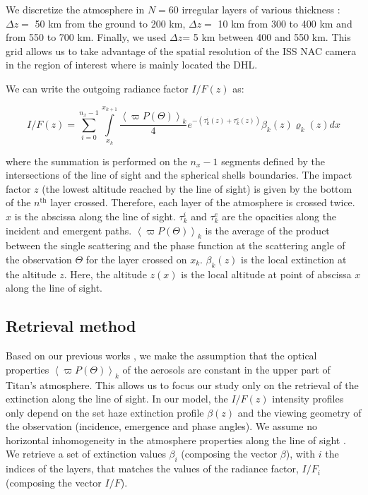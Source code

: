 We discretize the atmosphere in $N=60$ irregular layers of various thickness : $\Delta z =$ 50 km from the
ground to 200 km, $\Delta z =$ 10 km from 300 to 400 km and from 550 to 700 km. Finally, we used
$\Delta z$= 5 km between 400 and 550 km. This grid allows us to take advantage of the spatial resolution
of the ISS NAC camera in the region of interest where is mainly located the DHL.

We can write the outgoing radiance factor $I/F (z)$ as:

\begin{equation}
I/F (z) = \sum_{i=0}^{n_x-1} \int\limits_{x_k}^{x_{k+1}}
\frac{\left< \varpi P(\Theta) \right>_k}{4}
e^{-\left( \tau^i_k\left(z\right) + \tau^e_k\left(z\right) \right)}
\beta_k\left(z\right) \varrho_k\left(z\right) d{x}
\label{eq:west2017_sup_limb}
\end{equation}

where the summation is performed on the $n_x-1$ segments defined by the intersections of the line of sight and the
spherical shells boundaries. The impact factor $z$ (the lowest altitude reached by the line of sight) is given by the
bottom of the $n^\mathrm{th}$ layer crossed. Therefore, each layer of the atmosphere is crossed twice. $x$ is the
abscissa along the line of sight. $\tau^i_k$ and $\tau^e_k$ are the opacities along the incident and emergent paths.
$\left< \varpi P(\Theta)\right>_k$ is the average of the product between the single scattering and the phase function
at the scattering angle of the observation $\Theta$ for the layer crossed on $x_k$.  $\beta_k(z)$ is the local
extinction at the altitude $z$. Here, the altitude $z(x)$ is the local altitude at point of abscissa $x$ along the
line of sight.


\subsection{Retrieval method}

Based on our previous works \citep{Seignovert2017, West2018}, we make the assumption that the optical properties
$\left<\varpi P(\Theta)\right>_k$ of the aerosols are constant in the upper part of Titan's atmosphere. This allows
us to focus our study only on the retrieval of the extinction along the line of sight.
In our model, the $I/F (z)$ intensity profiles only depend on the set haze extinction profile $\beta(z)$ and the viewing
geometry of the observation (incidence, emergence and phase angles). We assume no horizontal inhomogeneity in the atmosphere
properties along the line of sight \citep{Seignovert2017}. We retrieve a set of extinction values $\beta_i$ (composing
the vector ${\beta}$), with $i$ the indices of the layers, that matches the values of the radiance factor, $I/F_i$
(composing the vector $I/F$).

